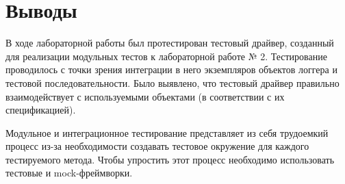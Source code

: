 \documentclass[a4paper,14pt]{extarticle}
\begin{document}
\section*{Выводы}
В ходе лабораторной работы был протестирован тестовый драйвер, созданный
для реализации модульных тестов к лабораторной работе № 2. Тестирование
проводилось с точки зрения интеграции в него экземпляров объектов логгера
и тестовой последовательности. Было выявлено, что тестовый драйвер правильно
взаимодействует с используемыми объектами (в соответствии с их спецификацией).

Модульное и интеграционное тестирование представляет из себя трудоемкий процесс
из-за необходимости создавать тестовое окружение для каждого тестируемого метода.
Чтобы упростить этот процесс необходимо использовать тестовые и mock-фреймворки. 
\end{document}
